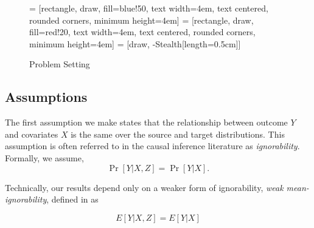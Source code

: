 \documentclass{article} %
\newtheorem{assumption}{Assumption}
\begin{document}



\begin{figure}[H]
\centering
     = [rectangle, draw, fill=blue!50, 
    text width=4em, text centered, rounded corners, minimum height=4em]
     = [rectangle, draw, fill=red!20, 
    text width=4em, text centered, rounded corners, minimum height=4em]
     = [draw, -{Stealth[length=0.5cm]}]
    \caption{Problem Setting}
\label{setup}
\end{figure}

\subsection{Assumptions}

The first assumption we make states that the relationship between outcome $Y$ and covariates $X$ is the same over the source and target distributions. This assumption is often referred to in the causal inference literature as \emph{ignorability}. Formally, we assume,
$$\Pr[Y|X,Z] = \Pr[Y|X].$$

Technically, our results depend only on a weaker form of ignorability, \emph{weak mean-ignorability}, defined in \cite{kallus2020generalized} as

\begin{equation*}
    E[Y|X,Z] = E[Y|X]
\end{equation*}
\end{document}
